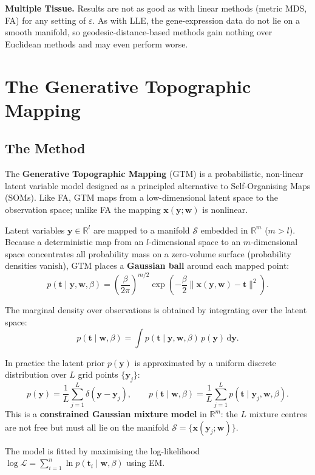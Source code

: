 \documentclass[11pt, oneside]{book}
\begin{document}
\textbf{Multiple Tissue.}
Results are not as good as with linear methods (metric MDS, FA) for any
setting of $\varepsilon$.
As with LLE, the gene-expression data do not lie on a smooth manifold, so
geodesic-distance-based methods gain nothing over Euclidean methods and may
even perform worse.

\section{The Generative Topographic Mapping}%
\label{sec:gtm}

\subsection{The Method}

The \textbf{Generative Topographic Mapping} (GTM) is a probabilistic,
non-linear latent variable model designed as a principled alternative to
Self-Organising Maps (SOMs).
Like FA, GTM maps from a low-dimensional latent space to the observation space;
unlike FA the mapping $\bm{x}(\bm{y};\bm{w})$ is nonlinear.

Latent variables $\bm{y}\in\mathbb{R}^l$ are mapped to a manifold
$\mathcal{S}$ embedded in $\mathbb{R}^m$ ($m>l$).
Because a deterministic map from an $l$-dimensional space to an
$m$-dimensional space concentrates all probability mass on a zero-volume
surface (probability densities vanish), GTM places a \textbf{Gaussian ball}
around each mapped point:
\[
  p(\bm{t}\mid\bm{y},\bm{w},\beta)
  = \left(\frac{\beta}{2\pi}\right)^{m/2}
    \exp\!\left(-\frac{\beta}{2}\|\bm{x}(\bm{y},\bm{w})-\bm{t}\|^2\right).
\]

The marginal density over observations is obtained by integrating over the
latent space:
\[
  p(\bm{t}\mid\bm{w},\beta) = \int p(\bm{t}\mid\bm{y},\bm{w},\beta)\,p(\bm{y})\,\mathrm{d}\bm{y}.
\]

In practice the latent prior $p(\bm{y})$ is approximated by a uniform discrete
distribution over $L$ grid points $\{\bm{y}_j\}$:
\[
  p(\bm{y}) = \frac{1}{L}\sum_{j=1}^L \delta(\bm{y}-\bm{y}_j),
  \qquad
  p(\bm{t}\mid\bm{w},\beta) = \frac{1}{L}\sum_{j=1}^L
    p(\bm{t}\mid\bm{y}_j,\bm{w},\beta).
\]
This is a \textbf{constrained Gaussian mixture model} in $\mathbb{R}^m$: the
$L$ mixture centres are not free but must all lie on the manifold
$\mathcal{S}=\{\bm{x}(\bm{y}_j;\bm{w})\}$.

The model is fitted by maximising the log-likelihood
$\log\mathcal{L}=\sum_{i=1}^n \ln p(\bm{t}_i\mid\bm{w},\beta)$ using EM.
\end{document}
